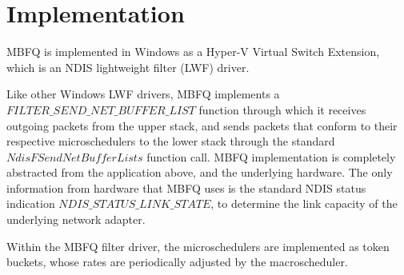 \section{Implementation}
\label{sec:implementation}

MBFQ is implemented in Windows as a Hyper-V Virtual Switch Extension, which is an NDIS 
lightweight filter (LWF) driver.

Like other Windows LWF drivers, MBFQ implements a $FILTER\_SEND\_NET\_BUFFER\_LIST$ function
through which it receives outgoing packets from the upper stack, and sends packets that conform
to their respective microschedulers to the lower stack through the standard $NdisFSendNetBufferLists$
function call.  MBFQ implementation is completely abstracted from the application above, and the underlying 
hardware.  The only information from hardware that MBFQ uses is the standard NDIS status indication
$NDIS\_STATUS\_LINK\_STATE$, to determine the link capacity of the underlying network adapter.

Within the MBFQ filter driver, the microschedulers are implemented as token buckets, whose rates are
periodically adjusted by the macroscheduler.


